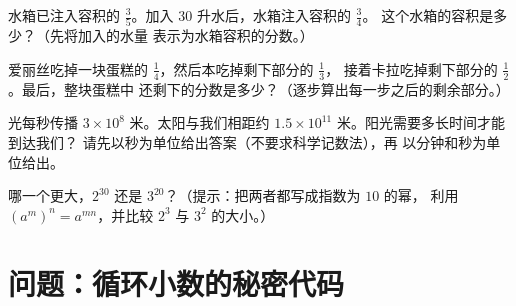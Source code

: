 \begin{exercise}[$\star\star$]\label{exo:g9:fractions:7}
水箱已注入容积的 $\frac35$。加入 $30$ 升水后，水箱注入容积的 $\frac34$。
这个水箱的容积是多少？（先将加入的水量
表示为水箱容积的分数。）
\end{exercise}

\begin{exercise}[$\star\star$]\label{exo:g9:fractions:8}
爱丽丝吃掉一块蛋糕的 $\frac14$，然后本吃掉剩下部分的 $\frac13$，
接着卡拉吃掉剩下部分的 $\frac12$。最后，整块蛋糕中
还剩下的分数是多少？（逐步算出每一步之后的剩余部分。）
\end{exercise}

\begin{exercise}[$\star\star$]\label{exo:g9:fractions:9}
光每秒传播 $3 \times 10^8$ 米。太阳与我们相距约
$1.5 \times 10^{11}$ 米。阳光需要多长时间才能到达我们？
请先以秒为单位给出答案（不要求科学记数法），再
以分钟和秒为单位给出。
\end{exercise}

\begin{exercise}[$\star\star\star$]\label{exo:g9:fractions:10}
哪一个更大，$2^{30}$ 还是 $3^{20}$？（提示：把两者都写成指数为 $10$ 的幂，
利用 $\left(a^m\right)^n = a^{mn}$，并比较 $2^3$ 与
$3^2$ 的大小。）
\end{exercise}

\section{问题：循环小数的秘密代码}

